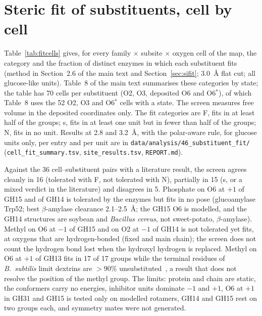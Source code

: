 \documentclass[preprint,12pt]{elsarticle}
\begin{document}
\section{Steric fit of substituents, cell by cell}
Table~\ref{tab:fitcells} gives, for every family $\times$ subsite $\times$ oxygen cell of the map, the
category and the fraction of distinct enzymes in which each substituent fits (method in Section~2.6 of
the main text and Section~\ref{sec:sifit}; 3.0~\AA{} flat cut; all glucose-like units). Table~8 of the main text summarises these
categories by state; the table has 70 cells per substituent (O2, O3, deposited O6 and O6$^\ast$), of which Table~8
uses the 52 O2, O3 and O6$^\ast$ cells with a state. The screen measures free volume in the deposited coordinates only. The fit categories are F, fits in at least half of the groups; s, fits in at least
one unit but in fewer than half of the groups; N, fits in no unit. Results at 2.8 and 3.2~\AA, with the
polar-aware rule, for glucose units only, per entry and per unit are in
\texttt{data/analysis/46\_substituent\_fit/} (\texttt{cell\_fit\_summary.tsv}, \texttt{site\_results.tsv},
\texttt{REPORT.md}).

Against the 36 cell--substituent pairs with a literature result, the screen agrees cleanly in 16 (tolerated with F,
not tolerated with N), partially in 15 (s, or a mixed verdict in the literature) and disagrees in 5. Phosphate on O6
at $+1$ of GH15 and of GH14 is tolerated by the enzymes but fits in no pose (glucoamylase Trp52; best
$\beta$-amylase clearance 2.1--2.5~\AA; the GH15 O6 is modelled, and the GH14 structures are soybean and
\emph{Bacillus cereus}, not sweet-potato, $\beta$-amylase). Methyl on O6 at $-1$ of GH15 and on O2 at $-1$ of GH14 is
not tolerated yet fits, at oxygens that are hydrogen-bonded (fixed and main chain); the screen does not count the hydrogen bond
lost when the hydroxyl hydrogen is replaced. Methyl on O6 at $+1$ of GH13 fits in 17 of 17 groups while the terminal
residues of \emph{B.~subtilis} limit dextrins are $>$90\% unsubstituted~\citep{vanderBurgt2000b}, a result that does
not resolve the position of the methyl group. The limits: protein and chain are static, the conformers carry no
energies, inhibitor units dominate $-1$ and $+1$, O6 at $+1$ in GH31 and GH15 is tested only on modelled rotamers,
GH14 and GH15 rest on two groups each, and symmetry mates were not generated.
\end{document}
